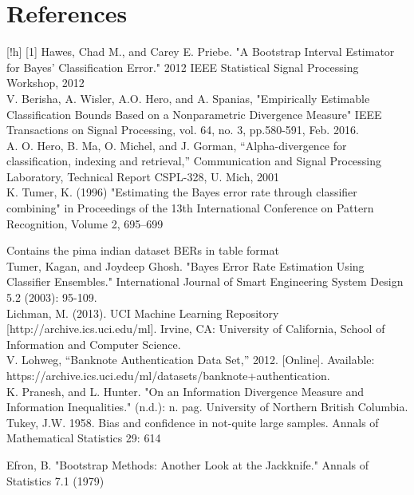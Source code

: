 \documentclass{article}
\begin{document}
	\section*{References}[!h]
	[1] Hawes, Chad M., and Carey E. Priebe. "A Bootstrap Interval Estimator for Bayes' Classification Error." 2012 IEEE Statistical Signal Processing Workshop, 2012
	\\ [0.5ex]
	\noindent[2] V. Berisha, A. Wisler, A.O. Hero, and A. Spanias, "Empirically Estimable Classification Bounds Based on a Nonparametric Divergence Measure" IEEE Transactions on Signal Processing, vol. 64, no. 3, pp.580-591, Feb. 2016.
	\\ [0.5ex]
	\noindent[3] A. O. Hero, B. Ma, O. Michel, and J. Gorman, “Alpha-divergence for classification, indexing and retrieval,” Communication and Signal Processing Laboratory, Technical Report CSPL-328, U. Mich, 2001
	\\ [0.5ex]
	\noindent [4] K. Tumer, K. (1996) "Estimating the Bayes error rate through classifier combining" in Proceedings of the 13th International Conference on Pattern Recognition, Volume 2, 695–699
	
	Contains the pima indian dataset BERs in table format
	\\ [0.5ex]
	\noindent[5] Tumer, Kagan, and Joydeep Ghosh. "Bayes Error Rate Estimation Using Classifier Ensembles." International Journal of Smart Engineering System Design 5.2 (2003): 95-109.
	\\ [0.5ex]
	
	\noindent[6] Lichman, M. (2013). UCI Machine Learning Repository [http://archive.ics.uci.edu/ml]. Irvine, CA: University of California, School of Information and Computer Science.
	\\ [0.5ex]
	
	\noindent [7] V. Lohweg, “Banknote Authentication Data Set,” 2012. [Online]. Available: https://archive.ics.uci.edu/ml/datasets/banknote+authentication.
	\\ [0.5ex]
	
	\noindent [8] K. Pranesh, and L. Hunter. "On an Information Divergence Measure and Information Inequalities." (n.d.): n. pag. University of Northern British Columbia. 
	\\ [0.5ex]
	
	\noindent [9] Tukey, J.W. 1958. Bias and confidence in not-quite large samples. Annals of Mathematical Statistics 29: 614
	
	\noindent [10]Efron, B. "Bootstrap Methods: Another Look at the Jackknife." Annals of Statistics 7.1 (1979)
	
\end{document}
